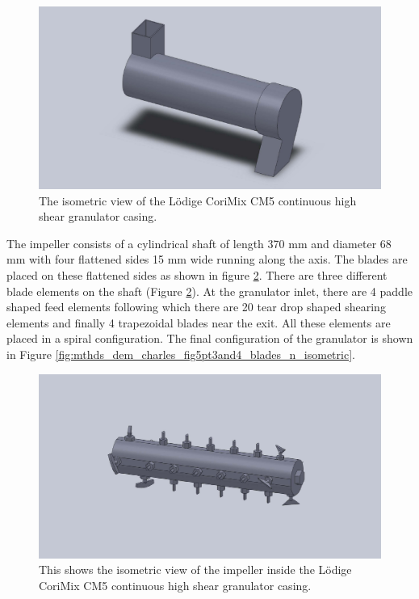 \documentclass[preprint,11pt,authoryear]{elsarticle}
\begin{document}
\begin{figure}[H]
\centering
\includegraphics[scale=0.2]{shell_final_pic.pdf}
\caption{The isometric view of the L\"{o}dige CoriMix CM5 continuous high shear granulator casing.}
\label{fig:mthdsDemCharlesGranShell}
\end{figure}

  The impeller consists of a cylindrical shaft of length 370 mm and diameter 68 mm with four 
flattened sides 15 mm wide running along the axis. The blades are placed on these flattened sides as 
shown in figure \ref{fig:mthds_dem_charles_impeller}. There are three different blade elements on the 
shaft (Figure \ref{fig:mthds_dem_charles_impeller}). At the granulator inlet, there are 4 paddle shaped 
feed elements following which there are 20 tear drop shaped shearing elements  and finally 4 
trapezoidal blades near the exit. All these elements are placed in a spiral configuration. The final 
configuration of the granulator is shown in Figure 
\ref{fig:mthds_dem_charles_fig5pt3and4_blades_n_isometric}.

\begin{figure}[H]
\centering
\includegraphics[scale=0.2]{impeller_final_pic.pdf}
\caption{This shows the isometric view of the impeller inside the L\"{o}dige CoriMix CM5 continuous high shear granulator casing.}
\label{fig:mthds_dem_charles_impeller}
\end{figure}    
\end{document}
